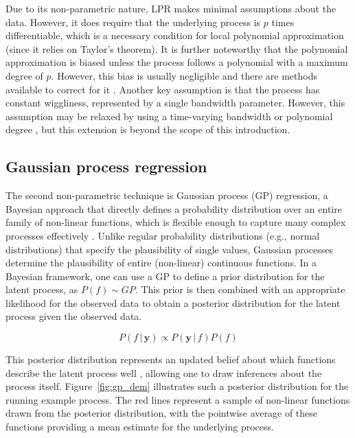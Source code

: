 \documentclass[man, floatsintext]{apa7}
\begin{document}
Due to its non-parametric nature, LPR makes minimal assumptions about the data.
However, it does require that the underlying process is $p$ times
differentiable, which is a necessary condition for local polynomial
approximation (since it relies on Taylor's theorem). It is further noteworthy
that the polynomial approximation is biased unless the process follows a
polynomial with a maximum degree of $p$. However, this bias is usually
negligible and there are methods available to correct for it
\parencite{R-nprobust}. Another key assumption is that the process has constant
wiggliness, represented by a single bandwidth parameter. However, this
assumption may be relaxed by using a time-varying bandwidth
\parencite{fan_data-driven_1995} or polynomial degree
\parencite{fan_adaptive_1995}, but this extension is beyond the scope of this
introduction.

\subsection{Gaussian process regression}

The second non-parametric technique is Gaussian process (GP) regression, a
Bayesian approach that directly defines a probability distribution over an
entire family of non-linear functions, which is flexible enough to capture many
complex processes effectively \parencite{rasmussen_gaussian_2006,
  betancourt_robust_2020, roberts_gaussian_2013}. Unlike regular probability
distributions (e.g., normal distributions) that specify the plausibility of
single values, Gaussian processes determine the plausibility of entire
(non-linear) continuous functions. In a Bayesian framework, one can use a GP to
define a prior distribution for the latent process, as $P(f) \sim GP$. This
prior is then combined with an appropriate likelihood for the observed data to
obtain a posterior distribution for the latent process given the observed data.

\begin{equation}
  P(f \, | \, \textbf{y})  \propto P(\textbf{y} \, | \, f) P(f)
\end{equation}

\noindent This posterior distribution represents an updated belief about which
functions describe the latent process well \parencite{kruschke_doing_2011},
allowing one to draw inferences about the process itself.
Figure~\ref{fig:gp_dem} illustrates such a posterior distribution for the
running example process. The red lines represent a sample of non-linear
functions drawn from the posterior distribution, with the pointwise average of
these functions providing a mean estimate for the underlying process.
\end{document}
